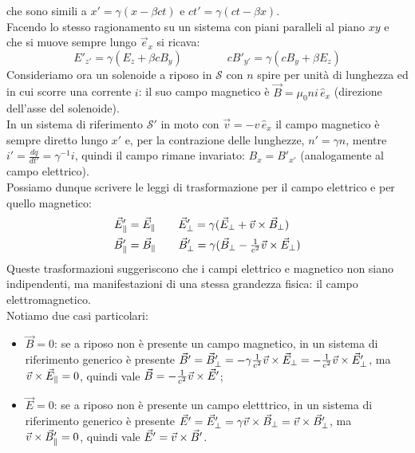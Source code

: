 che sono simili a $ x' = \gamma (x - \beta ct) $ e $ ct' = \gamma (ct - \beta x) $. \\ 
%
Facendo lo stesso ragionamento su un sistema con piani paralleli al piano $ xy $ e che si muove sempre lungo $ \vec{e}_x $ si ricava:
\begin{equation}
	E'_{z'} = \gamma(E_z + \beta cB_y) \qquad\qquad cB'_{y'} = \gamma (cB_y + \beta E_z)
	\label{eq:45}
\end{equation}
%
Consideriamo ora un solenoide a riposo in $ \mathcal{S} $ con $ n $ spire per unità di lunghezza ed in cui scorre una corrente $ i $: il suo campo magnetico è $ \vec{B} = \mu_0 n i \,\hat{e}_x $ (direzione dell'asse del solenoide). \\ 
%
In un sistema di riferimento $ \mathcal{S}' $ in moto con $ \vec{v} = -v \,\hat{e}_x $ il campo magnetico è sempre diretto lungo $ x' $ e, per la contrazione delle lunghezze, $ n' = \gamma n $, mentre $ i' = \frac{dq}{dt'} = \gamma^{-1} i $, quindi il campo rimane invariato: $ B_x = B'_{x'} $ (analogamente al campo elettrico). \\ 
%
Possiamo dunque scrivere le leggi di trasformazione per il campo elettrico e per quello magnetico:
\begin{equation}
	\begin{split}
		\vec{E}'_{\parallel} &= \vec{E}_{\parallel} \qquad \vec{E}'_{\perp} = \gamma (\vec{E}_{\perp} + \vec{v}\times\vec{B}_{\perp}) \\ 
		\vec{B}'_{\parallel} &= \vec{B}_{\parallel} \qquad \vec{B}'_{\perp} = \gamma (\vec{B}_{\perp} - \tfrac{1}{c^2} \vec{v}\times\vec{E}_{\perp})
	\end{split}
	\label{eq:46}
\end{equation}
Queste trasformazioni suggeriscono che i campi elettrico e magnetico non siano indipendenti, ma manifestazioni di una stessa grandezza fisica: il campo elettromagnetico. \\ 
%
Notiamo due casi particolari:
\begin{itemize}
	\item $ \vec{B} = 0 $: se a riposo non è presente un campo magnetico, in un sistema di riferimento generico è presente $ \vec{B}' = \vec{B}'_{\perp} = -\gamma \frac{1}{c^2}\vec{v}\times\vec{E}_{\perp} = -\frac{1}{c^2}\vec{v}\times\vec{E}'_{\perp} $, ma $ \vec{v}\times\vec{E}_{\parallel} = 0 $, quindi vale $ \vec{B} = -\frac{1}{c^2}\vec{v}\times\vec{E}' $;
	\item $ \vec{E} = 0 $: se a riposo non è presente un campo eletttrico, in un sistema di riferimento generico è presente $ \vec{E}' = \vec{E}'_{\perp} = \gamma \vec{v}\times\vec{B}_{\perp} = \vec{v}\times\vec{B}'_{\perp} $, ma $ \vec{v}\times\vec{B}'_{\parallel} = 0 $, quindi vale $ \vec{E}' = \vec{v}\times\vec{B}' $.
\end{itemize}
